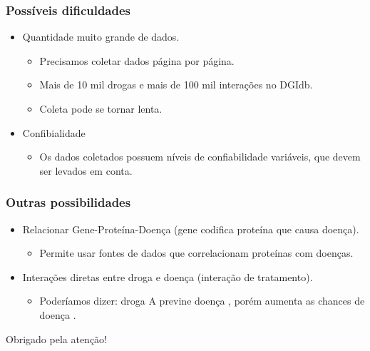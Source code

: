 \documentclass[12pt]{beamer}
\begin{document}
\begin{frame}
  \frametitle{Possíveis dificuldades}

  \begin{itemize}
    \item Quantidade muito grande de dados.
          \begin{itemize}
            \item Precisamos coletar dados página por página.
            \item Mais de 10 mil drogas e mais de 100 mil interações no DGIdb.
            \item Coleta pode se tornar lenta.
          \end{itemize}
    \item Confibialidade
          \begin{itemize}
            \item Os dados coletados possuem níveis de confiabilidade
                  variáveis, que devem ser levados em conta.
          \end{itemize}
  \end{itemize}
\end{frame}

\begin{frame}
  \frametitle{Outras possibilidades}

  \begin{itemize}
    \item<1-> Relacionar Gene-Proteína-Doença (gene codifica proteína que causa doença).
    \begin{itemize}
      \item Permite usar fontes de dados que correlacionam proteínas com doenças.
    \end{itemize}
    \item<2-> Interações diretas entre droga e doença (interação de tratamento).
    \begin{itemize}
      \item Poderíamos dizer: droga A previne doença \textalpha, porém
            aumenta as chances de doença \textgamma.
    \end{itemize}
  \end{itemize}
\end{frame}

\begin{frame}
  \centering Obrigado pela atenção!
\end{frame}
\end{document}

